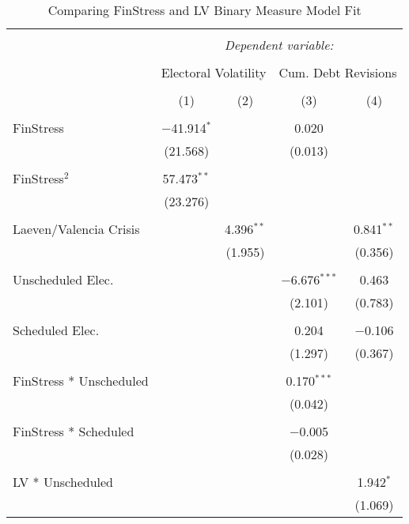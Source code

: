 \begin{table}[!htbp] \centering
  \caption{ Comparing FinStress and LV Binary Measure Model Fit}
  \label{finlvregcompare}
\tiny
\begin{tabular}{@{\extracolsep{5pt}}lcccc}
\\[-1.8ex]\hline
\hline \\[-1.8ex]
 & \multicolumn{4}{c}{\textit{Dependent variable:}} \\
\cline{2-5}
\\[-1.8ex] & \multicolumn{2}{c}{Electoral Volatility} & \multicolumn{2}{c}{Cum. Debt Revisions} \\
\\[-1.8ex] & (1) & (2) & (3) & (4)\\
\hline \\[-1.8ex]
 FinStress & $-$41.914$^{*}$ &  & 0.020 &  \\
  & (21.568) &  & (0.013) &  \\
  & & & & \\
 FinStress$^2$ & 57.473$^{**}$ &  &  &  \\
  & (23.276) &  &  &  \\
  & & & & \\
 Laeven/Valencia Crisis &  & 4.396$^{**}$ &  & 0.841$^{**}$ \\
  &  & (1.955) &  & (0.356) \\
  & & & & \\
 Unscheduled Elec. &  &  & $-$6.676$^{***}$ & 0.463 \\
  &  &  & (2.101) & (0.783) \\
  & & & & \\
 Scheduled Elec. &  &  & 0.204 & $-$0.106 \\
  &  &  & (1.297) & (0.367) \\
  & & & & \\
 FinStress * Unscheduled &  &  & 0.170$^{***}$ &  \\
  &  &  & (0.042) &  \\
  & & & & \\
 FinStress * Scheduled &  &  & $-$0.005 &  \\
  &  &  & (0.028) &  \\
  & & & & \\
 LV * Unscheduled &  &  &  & 1.942$^{*}$ \\
  &  &  &  & (1.069) \\

\end{tabular}
\end{table}
